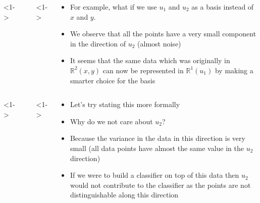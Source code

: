 \begin{frame}
  \begin{columns}
    <1->
    \begin{overlayarea}{\textwidth}{\textheight}
      \makebox[\textwidth][c]{\usebox{\pcabnwaxiscontent}}
    \end{overlayarea}

    <1->
    \begin{overlayarea}{\textwidth}{\textheight}
      \begin{itemize}\justifying
        \item<1-> For example, what if we use $u_1$ and $u_2$ as a basis instead of $x$ and $y$.
        \item<2-> We observe that all the points have a very small component in the direction of $u_2$ (almost noise)
        \item<3-> It seems that the same data which was originally in $\mathbb{R}^2(x,y)$ can now be represented in $\mathbb{R}^{1}(u_1)$ by making a smarter choice for the basis
      \end{itemize}
    \end{overlayarea}
  \end{columns}
\end{frame}

\begin{frame}
  \begin{columns}
    <1->
    \begin{overlayarea}{\textwidth}{\textheight}

    \end{overlayarea}

    <1->
    \begin{overlayarea}{\textwidth}{\textheight}
      \begin{itemize}\justifying
        \item<1-> Let's try stating this more formally
        \item<2-> Why do we not care about $u_2$?
        \item<3-> Because the variance in the data in this direction is very small (all data points have almost the same value in the $u_2$ direction)
        \item<4-> If we were to build a classifier on top of this data then $u_2$ would not contribute to the classifier as the points are not distinguishable along this direction
      \end{itemize}
    \end{overlayarea}
  \end{columns}
\end{frame}

